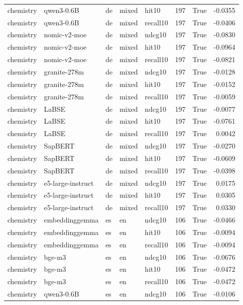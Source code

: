 \begin{tabular}{lllllrrr}
chemistry & qwen3-0.6B & de & mixed & hit10 & 197 & True & -0.0355 \\
chemistry & qwen3-0.6B & de & mixed & recall10 & 197 & True & -0.0406 \\
chemistry & nomic-v2-moe & de & mixed & ndcg10 & 197 & True & -0.0830 \\
chemistry & nomic-v2-moe & de & mixed & hit10 & 197 & True & -0.0964 \\
chemistry & nomic-v2-moe & de & mixed & recall10 & 197 & True & -0.0821 \\
chemistry & granite-278m & de & mixed & ndcg10 & 197 & True & -0.0128 \\
chemistry & granite-278m & de & mixed & hit10 & 197 & True & -0.0152 \\
chemistry & granite-278m & de & mixed & recall10 & 197 & True & -0.0059 \\
chemistry & LaBSE & de & mixed & ndcg10 & 197 & True & -0.0077 \\
chemistry & LaBSE & de & mixed & hit10 & 197 & True & -0.0761 \\
chemistry & LaBSE & de & mixed & recall10 & 197 & True & 0.0042 \\
chemistry & SapBERT & de & mixed & ndcg10 & 197 & True & -0.0270 \\
chemistry & SapBERT & de & mixed & hit10 & 197 & True & -0.0609 \\
chemistry & SapBERT & de & mixed & recall10 & 197 & True & -0.0398 \\
chemistry & e5-large-instruct & de & mixed & ndcg10 & 197 & True & 0.0175 \\
chemistry & e5-large-instruct & de & mixed & hit10 & 197 & True & 0.0305 \\
chemistry & e5-large-instruct & de & mixed & recall10 & 197 & True & 0.0330 \\
chemistry & embeddinggemma & es & en & ndcg10 & 106 & True & -0.0466 \\
chemistry & embeddinggemma & es & en & hit10 & 106 & True & -0.0094 \\
chemistry & embeddinggemma & es & en & recall10 & 106 & True & -0.0094 \\
chemistry & bge-m3 & es & en & ndcg10 & 106 & True & -0.0676 \\
chemistry & bge-m3 & es & en & hit10 & 106 & True & -0.0472 \\
chemistry & bge-m3 & es & en & recall10 & 106 & True & -0.0472 \\
chemistry & qwen3-0.6B & es & en & ndcg10 & 106 & True & -0.0106 \\

\end{tabular}
